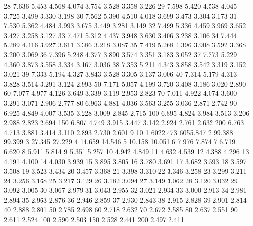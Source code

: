\documentclass[onecolumn,11pt]{book}
\begin{document}
\begin{Schunk}
\begin{Soutput}
28     7.636    5.453    4.568    4.074    3.754    3.528    3.358    3.226
29     7.598    5.420    4.538    4.045    3.725    3.499    3.330    3.198
30     7.562    5.390    4.510    4.018    3.699    3.473    3.304    3.173
31     7.530    5.362    4.484    3.993    3.675    3.449    3.281    3.149
32     7.499    5.336    4.459    3.969    3.652    3.427    3.258    3.127
33     7.471    5.312    4.437    3.948    3.630    3.406    3.238    3.106
34     7.444    5.289    4.416    3.927    3.611    3.386    3.218    3.087
35     7.419    5.268    4.396    3.908    3.592    3.368    3.200    3.069
36     7.396    5.248    4.377    3.890    3.574    3.351    3.183    3.052
37     7.373    5.229    4.360    3.873    3.558    3.334    3.167    3.036
38     7.353    5.211    4.343    3.858    3.542    3.319    3.152    3.021
39     7.333    5.194    4.327    3.843    3.528    3.305    3.137    3.006
40     7.314    5.179    4.313    3.828    3.514    3.291    3.124    2.993
50     7.171    5.057    4.199    3.720    3.408    3.186    3.020    2.890
60     7.077    4.977    4.126    3.649    3.339    3.119    2.953    2.823
70     7.011    4.922    4.074    3.600    3.291    3.071    2.906    2.777
80     6.963    4.881    4.036    3.563    3.255    3.036    2.871    2.742
90     6.925    4.849    4.007    3.535    3.228    3.009    2.845    2.715
100    6.895    4.824    3.984    3.513    3.206    2.988    2.823    2.694
150    6.807    4.749    3.915    3.447    3.142    2.924    2.761    2.632
200    6.763    4.713    3.881    3.414    3.110    2.893    2.730    2.601
           9       10
1   6022.473 6055.847
2     99.388   99.399
3     27.345   27.229
4     14.659   14.546
5     10.158   10.051
6      7.976    7.874
7      6.719    6.620
8      5.911    5.814
9      5.351    5.257
10     4.942    4.849
11     4.632    4.539
12     4.388    4.296
13     4.191    4.100
14     4.030    3.939
15     3.895    3.805
16     3.780    3.691
17     3.682    3.593
18     3.597    3.508
19     3.523    3.434
20     3.457    3.368
21     3.398    3.310
22     3.346    3.258
23     3.299    3.211
24     3.256    3.168
25     3.217    3.129
26     3.182    3.094
27     3.149    3.062
28     3.120    3.032
29     3.092    3.005
30     3.067    2.979
31     3.043    2.955
32     3.021    2.934
33     3.000    2.913
34     2.981    2.894
35     2.963    2.876
36     2.946    2.859
37     2.930    2.843
38     2.915    2.828
39     2.901    2.814
40     2.888    2.801
50     2.785    2.698
60     2.718    2.632
70     2.672    2.585
80     2.637    2.551
90     2.611    2.524
100    2.590    2.503
150    2.528    2.441
200    2.497    2.411
\end{Soutput}
\end{Schunk}
\vfill
\eject


 
 
\printindex
 
\end{document}
